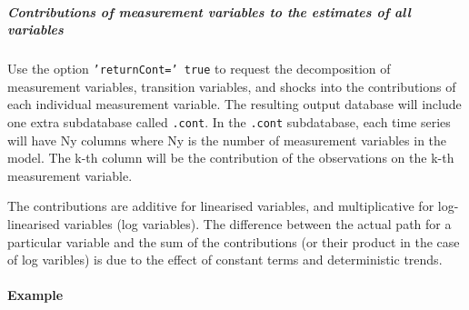 \subparagraph{Contributions of measurement variables to the estimates of
all
variables}

Use the option \texttt{'returnCont=' true} to request the decomposition
of measurement variables, transition variables, and shocks into the
contributions of each individual measurement variable. The resulting
output database will include one extra subdatabase called
\texttt{.cont}. In the \texttt{.cont} subdatabase, each time series will
have Ny columns where Ny is the number of measurement variables in the
model. The k-th column will be the contribution of the observations on
the k-th measurement variable.

The contributions are additive for linearised variables, and
multiplicative for log-linearised variables (log variables). The
difference between the actual path for a particular variable and the sum
of the contributions (or their product in the case of log varibles) is
due to the effect of constant terms and deterministic trends.

\paragraph{Example}


